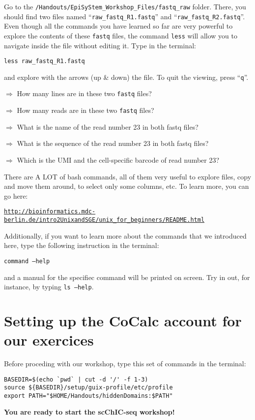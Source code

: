 \documentclass[11pt]{article}
\begin{document}
\begin{itemize}
Go to the \texttt{/Handouts/EpiSyStem\_Workshop\_Files/fastq\_raw} folder. There, you should find two files named ``\texttt{raw\_fastq\_R1.fastq}'' and ``\texttt{raw\_fastq\_R2.fastq}''. Even though all the commands you have learned so far are very powerful to explore the contents of these \texttt{fastq} files, the command \texttt{less} will allow you to navigate inside the file without editing it. Type in the terminal:
\begin{verbatim}
less raw_fastq_R1.fastq
\end{verbatim}
and explore with the arrows (up \& down) the file. To quit the viewing, press ``\texttt{q}''.

\vspace{1em}
\hrulefill

$\Rightarrow$ How many lines are in these two \texttt{fastq} files?

$\Rightarrow$ How many reads are in these two \texttt{fastq} files?

$\Rightarrow$ What is the name of the read number 23 in both fastq files? 

$\Rightarrow$ What is the sequence of the read number 23 in both fastq files? 

$\Rightarrow$ Which is the UMI and the cell-specific barcode of read number 23?

\hrulefill
\vspace{1em}

\end{itemize}

There are A LOT of bash commands, all of them very useful to explore files, copy and move them around, to select only some columns, etc. 
To learn more, you can go here: 

\href{http://bioinformatics.mdc-berlin.de/intro2UnixandSGE/unix_for_beginners/README.html}{\texttt{http://bioinformatics.mdc-berlin.de/intro2UnixandSGE/unix\_for\_beginners/README.html}}

Additionally, if you want to learn more about the commands that we introduced here, type the following instruction in the terminal: 

\texttt{command --help}

and a manual for the specifiec command will be printed on screen. Try in out, for instance, by typing \texttt{ls --help}.



\section*{Setting up the CoCalc account for our exercices}

Before proceding with our workshop, type this set of commands in the terminal:

\begin{verbatim}
BASEDIR=$(echo `pwd` | cut -d '/' -f 1-3)
source ${BASEDIR}/setup/guix-profile/etc/profile
export PATH="$HOME/Handouts/hiddenDomains:$PATH"
\end{verbatim}

\textbf{You are ready to start the scChIC-seq workshop!}
\end{document}
